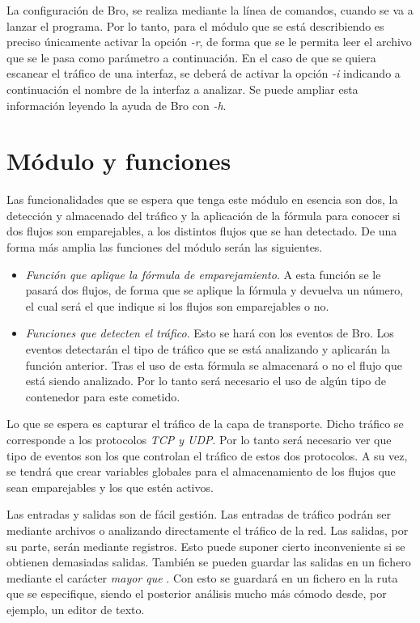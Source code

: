 \intro La configuración de Bro, se realiza mediante la línea de comandos, cuando se va a lanzar el programa. Por lo tanto, para el 
módulo que se está describiendo es preciso únicamente activar la opción \textit{-r}, de forma que se le permita leer el archivo que se 
le pasa como parámetro a continuación. En el caso de que se quiera escanear el tráfico de una interfaz, se deberá de activar la opción 
\textit{-i} indicando a continuación el nombre de la interfaz a analizar. Se puede ampliar esta información leyendo la ayuda de Bro con \textit{-h}.

\section{Módulo y funciones}

Las funcionalidades que se espera que tenga este módulo en esencia son dos, la detección y almacenado 
del tráfico y la aplicación de la fórmula para conocer si dos flujos son emparejables, a los distintos flujos que 
se han detectado. De una forma más amplia las funciones del módulo serán las siguientes. 

\begin{itemize}
\item \textit{Función que aplique la fórmula de emparejamiento}. 
\intro A esta función se le pasará dos flujos, de forma que se aplique la fórmula y devuelva un número, el cual 
será el que indique si los flujos son emparejables o no.
\item \textit{Funciones que detecten el tráfico}. 
\intro Esto se hará con los eventos de Bro. Los eventos detectarán el tipo de tráfico que se está analizando 
y aplicarán la función anterior.
\intro Tras el uso de esta fórmula se almacenará o no el flujo que está siendo analizado. Por lo tanto 
será necesario el uso de algún tipo de contenedor para este cometido.
\end{itemize}

\intro Lo que se espera es capturar el tráfico de la capa de transporte. Dicho tráfico se corresponde a los 
protocolos \textit{TCP y UDP}. Por lo tanto será necesario ver que tipo de eventos son los que controlan el tráfico 
de estos dos protocolos. A su vez, se tendrá que crear variables globales para el almacenamiento de los flujos que sean emparejables 
y los que estén activos.

\intro Las entradas y salidas son de fácil gestión. Las entradas de tráfico podrán ser mediante archivos o 
analizando directamente el tráfico de la red. Las salidas, por su parte, serán mediante registros. Esto puede 
suponer cierto inconveniente si se obtienen demasiadas salidas. También se pueden guardar las salidas en un 
fichero mediante el carácter \textit{mayor que} . Con esto se guardará en un fichero en la ruta que se especifique, siendo el 
posterior análisis mucho más cómodo desde, por ejemplo, un editor de texto.

